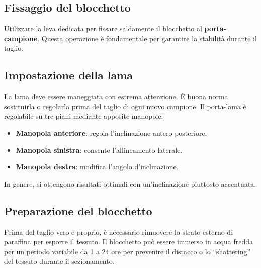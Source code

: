 \subsection{Fissaggio del blocchetto}

Utilizzare la leva dedicata per fissare saldamente il blocchetto al \textbf{porta-campione}. Questa operazione è fondamentale per garantire la stabilità durante il taglio.


\subsection{Impostazione della lama}

La lama deve essere maneggiata con estrema attenzione. È buona norma sostituirla o regolarla prima del taglio di ogni nuovo campione. Il porta-lama è regolabile su tre piani mediante apposite manopole:

\begin{itemize}
    \item \textbf{Manopola anteriore}: regola l'inclinazione antero-posteriore.
    \item \textbf{Manopola sinistra}: consente l'allineamento laterale.
    \item \textbf{Manopola destra}: modifica l'angolo d'inclinazione.
\end{itemize}

In genere, si ottengono risultati ottimali con un'inclinazione piuttosto accentuata.


\subsection{Preparazione del blocchetto}

Prima del taglio vero e proprio, è necessario rimuovere lo strato esterno di paraffina per esporre il tessuto. Il blocchetto può essere immerso in acqua fredda per un periodo variabile da 1 a 24 ore per prevenire il distacco o lo “shattering” del tessuto durante il sezionamento.

